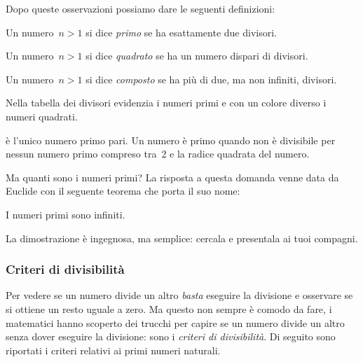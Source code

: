 Dopo queste osservazioni possiamo dare le seguenti definizioni:

\begin{definizione}
 Un numero~\(n>1\) si dice \emph{primo} se ha esattamente due divisori. 
\end{definizione}

\begin{definizione}
 Un numero~\(n>1\) si dice \emph{quadrato} se ha un numero dispari di 
divisori. 
\end{definizione}

\begin{definizione}
 Un numero~\(n>1\) si dice \emph{composto} se ha più di due, ma non infiniti, 
 divisori. 
\end{definizione}

Nella tabella dei divisori evidenzia i numeri primi e con un colore diverso 
i numeri quadrati.

 è l'unico numero primo pari.
\vspace{-1em}
\osservazione Un numero è primo quando non è divisibile per nessun numero 
primo compreso tra~2 e la radice quadrata del numero.

\vspace{1em}
Ma quanti sono i numeri primi? La risposta a questa domanda venne data da 
Euclide con il seguente teorema che porta il suo nome:

\begin{teorema}[di Euclide]
I numeri primi sono infiniti.
\end{teorema}

La dimostrazione è ingegnosa, ma semplice: cercala e presentala ai tuoi 
compagni.


\subsubsection{Criteri di divisibilità}
\label{sec:01_divisibilita}

Per vedere se un numero divide un altro \emph{basta} eseguire la 
divisione e osservare se si ottiene un resto uguale a zero. 
Ma questo non sempre è comodo da fare, i matematici hanno scoperto dei
trucchi per capire se un numero divide un altro senza dover eseguire 
la divisione: sono i \emph{criteri di divisibilità}. 
Di seguito sono riportati i criteri relativi ai primi numeri naturali.

